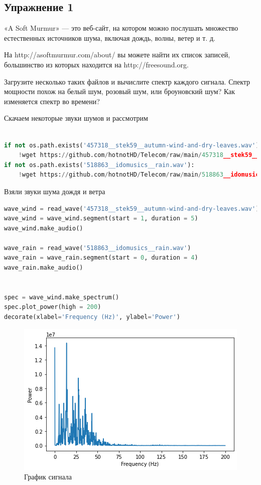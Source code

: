 \subsection{Упражнение 1}

«A Soft Murmur» — это веб-сайт, на котором можно послушать множество естественных источников шума, включая дождь, волны, ветер и т. д. 

\noindent На http://asoftmurmur.com/about/ вы можете найти их список записей, большинство из которых находится на http://freesound.org.

\noindent Загрузите несколько таких файлов и вычислите спектр каждого сигнала. Спектр мощности похож на белый шум, розовый шум, или броуновский шум? Как изменяется спектр во времени?

Скачаем некоторые звуки шумов и рассмотрим

\begin{lstlisting}[language=Python]

if not os.path.exists('457318__stek59__autumn-wind-and-dry-leaves.wav'):
    !wget https://github.com/hotnotHD/Telecom/raw/main/457318__stek59__autumn-wind-and-dry-leaves.wav
if not os.path.exists('518863__idomusics__rain.wav'):
    !wget https://github.com/hotnotHD/Telecom/raw/main/518863__idomusics__rain.wav
\end{lstlisting}
Взяли звуки шума дождя и ветра
\begin{lstlisting}[language=Python]
wave_wind = read_wave('457318__stek59__autumn-wind-and-dry-leaves.wav')
wave_wind = wave_wind.segment(start = 1, duration = 5)
wave_wind.make_audio()

wave_rain = read_wave('518863__idomusics__rain.wav')
wave_rain = wave_rain.segment(start = 0, duration = 4)
wave_rain.make_audio()


spec = wave_wind.make_spectrum()
spec.plot_power(high = 200)
decorate(xlabel='Frequency (Hz)', ylabel='Power')
\end{lstlisting}

\begin{figure}[H]
	\begin{center}
		\includegraphics[scale=1]{fig/lab04/lab04_01.png}
		\caption{График сигнала}
	\end{center}
\end{figure}


